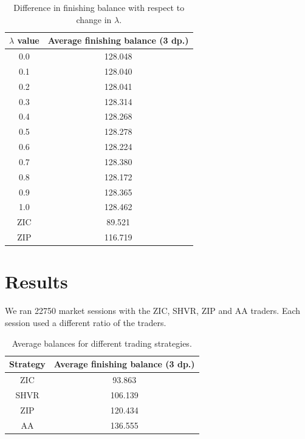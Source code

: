 \documentclass[preprint]{acm_proc_article-sp} %
\begin{document}
\begin{table}[h]
  \centering
  \label{tbl:lambda_results}
  \begin{tabular}{ | c | c | }
    \hline
    \textbf{$\lambda$ value} & \textbf{Average finishing balance (3 dp.)} \\
    \hline
        0.0 & 128.048 \\
        0.1 & 128.040 \\
        0.2 & 128.041 \\
        0.3 & 128.314 \\
        0.4 & 128.268 \\
        0.5 & 128.278 \\
        0.6 & 128.224 \\
        0.7 & 128.380 \\
        0.8 & 128.172 \\
        0.9 & 128.365 \\
        1.0 & 128.462 \\
    \hline \hline
        ZIC &  89.521 \\
        ZIP & 116.719 \\
    \hline
  \end{tabular}
  \caption{Difference in finishing balance with respect to change in $\lambda$.}
\end{table}


\section{Results} \label{sec:results}

We ran 22750 market sessions with the ZIC, SHVR, ZIP and AA traders.
Each session used a different ratio of the traders.

\begin{table}[h]
  \centering
  \label{tbl:results}
  \begin{tabular}{ | c | c | }
    \hline
    Strategy & Average finishing balance (3 dp.) \\
    \hline
    ZIC & 93.863 \\
    SHVR & 106.139 \\
    ZIP & 120.434 \\
    AA & 136.555 \\
    \hline
  \end{tabular}
  \caption{Average balances for different trading strategies.}
\end{table}
\end{document}
